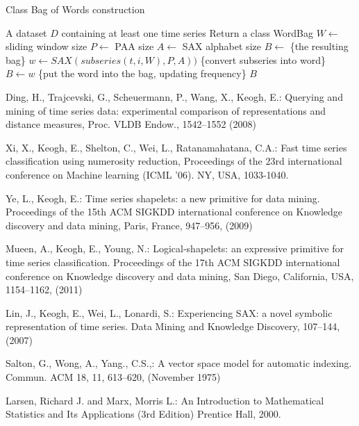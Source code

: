 \documentclass{llncs}
\begin{document}
\begin{algorithm}
\caption{Class Bag of Words construction}
\label{alg1}
\begin{algorithmic}[1]
\REQUIRE A dataset $D$ containing at least one time series
\ENSURE Return a class WordBag
\STATE $W \leftarrow$ sliding window size
\STATE $P \leftarrow$ PAA size
\STATE $A \leftarrow$ SAX alphabet size
\STATE $B \leftarrow$ \{the resulting bag\}
 \STATE $w \leftarrow SAX(subseries(t,i,W), P, A))$ \{convert subseries into word\}
 \STATE $B \leftarrow w$ \{put the word into the bag, updating frequency\}
 \ENDFOR
\ENDFOR
\RETURN $B$
\end{algorithmic}
\end{algorithm}

%
%
\begin{thebibliography}{5}
%

Ding, H., Trajcevski, G., Scheuermann, P., Wang, X., Keogh, E.:
Querying and mining of time series data: experimental comparison of representations and distance measures,
Proc. VLDB Endow., 1542--1552 (2008)

Xi, X., Keogh, E., Shelton, C., Wei, L., Ratanamahatana, C.A.:
Fast time series classification using numerosity reduction,
Proceedings of the 23rd international conference on Machine learning (ICML '06). 
NY, USA, 1033-1040.

Ye, L., Keogh, E.:
Time series shapelets: a new primitive for data mining.
Proceedings of the 15th ACM SIGKDD international conference on Knowledge discovery and data mining,
Paris, France, 947--956, (2009)

Mueen, A., Keogh, E., Young, N.:
Logical-shapelets: an expressive primitive for time series classification.
Proceedings of the 17th ACM SIGKDD international conference on Knowledge discovery and data mining,
San Diego, California, USA, 1154--1162, (2011)

Lin, J., Keogh, E., Wei, L., Lonardi, S.:
Experiencing SAX: a novel symbolic representation of time series.
Data Mining and Knowledge Discovery, 107--144, (2007)

Salton, G., Wong, A., Yang., C.S.,:
A vector space model for automatic indexing. 
Commun. ACM 18, 11, 613--620, (November 1975)

Larsen, Richard J. and Marx, Morris L.:
An Introduction to Mathematical Statistics and Its Applications (3rd Edition)
Prentice Hall, 2000.


\end{thebibliography}
\end{document}
